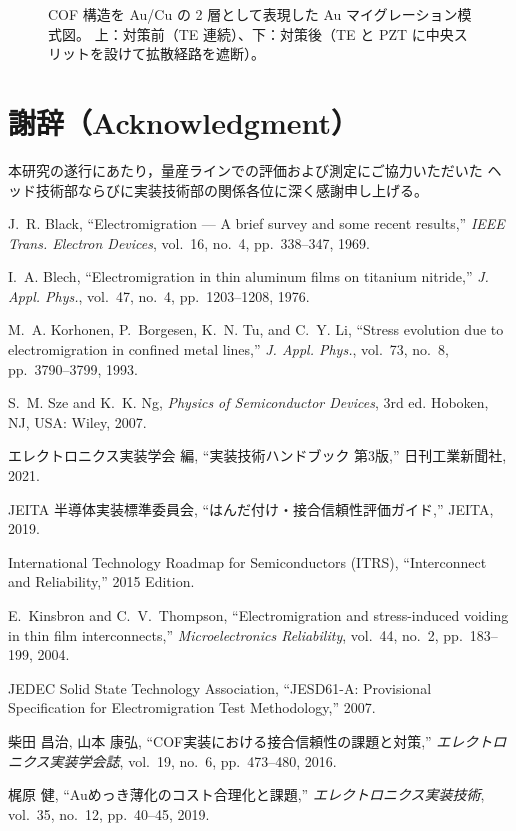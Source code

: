 \documentclass[conference]{IEEEtran}
\begin{document}
\begin{figure}[t]
  \vspace{-1mm}
  \caption{COF 構造を Au/Cu の 2 層として表現した Au マイグレーション模式図。
  上：対策前（TE 連続）、下：対策後（TE と PZT に中央スリットを設けて拡散経路を遮断）。}
  \label{fig:cof-before-after}
\end{figure}
\section*{謝辞（Acknowledgment）}
本研究の遂行にあたり，量産ラインでの評価および測定にご協力いただいた
ヘッド技術部ならびに実装技術部の関係各位に深く感謝申し上げる。

\balance

\begin{thebibliography}{99}

J.~R. Black, ``Electromigration --- A brief survey and some recent results,''
\emph{IEEE Trans. Electron Devices}, vol.~16, no.~4, pp.~338--347, 1969.

I.~A. Blech, ``Electromigration in thin aluminum films on titanium nitride,''
\emph{J. Appl. Phys.}, vol.~47, no.~4, pp.~1203--1208, 1976.

M.~A. Korhonen, P.~Borgesen, K.~N. Tu, and C.~Y. Li,
``Stress evolution due to electromigration in confined metal lines,''
\emph{J. Appl. Phys.}, vol.~73, no.~8, pp.~3790--3799, 1993.

S.~M. Sze and K.~K. Ng, \emph{Physics of Semiconductor Devices}, 3rd ed.
Hoboken, NJ, USA: Wiley, 2007.

エレクトロニクス実装学会 編, 
``実装技術ハンドブック 第3版,'' 日刊工業新聞社, 2021.

JEITA 半導体実装標準委員会, 
``はんだ付け・接合信頼性評価ガイド,'' JEITA, 2019.

International Technology Roadmap for Semiconductors (ITRS), 
``Interconnect and Reliability,'' 2015 Edition.

E.~Kinsbron and C.~V.~Thompson, 
``Electromigration and stress-induced voiding in thin film interconnects,''
\emph{Microelectronics Reliability}, vol.~44, no.~2, pp.~183--199, 2004.

JEDEC Solid State Technology Association, 
``JESD61-A: Provisional Specification for Electromigration Test Methodology,'' 2007.

柴田 昌治, 山本 康弘, 
``COF実装における接合信頼性の課題と対策,''
\emph{エレクトロニクス実装学会誌}, vol.~19, no.~6, pp.~473--480, 2016.

梶原 健, ``Auめっき薄化のコスト合理化と課題,'' 
\emph{エレクトロニクス実装技術}, vol.~35, no.~12, pp.~40--45, 2019.

\end{thebibliography}
\end{document}
